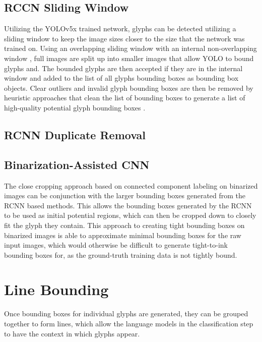\subsection{RCCN Sliding Window}

Utilizing the YOLOv5x trained network, glyphs can be detected utilizing a sliding window to keep the image sizes closer to the size that the network was trained on. Using an overlapping sliding window with an internal non-overlapping window , full images are split up into smaller images that allow YOLO to bound glyphs and. The bounded glyphs are then accepted if they are in the internal window and added to the list of all glyphs bounding boxes as bounding box objects. Clear outliers and invalid glyph bounding boxes are then be removed by heuristic approaches that clean the list of bounding boxes to generate a list of high-quality potential glyph bounding boxes .

\subsection{RCNN Duplicate Removal}

\subsection{Binarization-Assisted CNN}

The close cropping approach based on connected component labeling on binarized images can be conjunction with the larger bounding boxes generated from the RCNN based methods. This allows the bounding boxes generated by the RCNN to be used as initial potential regions, which can then be cropped down to closely fit the glyph they contain. This approach to creating tight bounding boxes on binarized images is able to approximate minimal bounding boxes for the raw input images, which would otherwise be difficult to generate tight-to-ink bounding boxes for, as the ground-truth training data is not tightly bound.

\section{Line Bounding}

Once bounding boxes for individual glyphs are generated, they can be grouped together to form lines, which allow the language models in the classification step to have the context in which glyphs appear.


